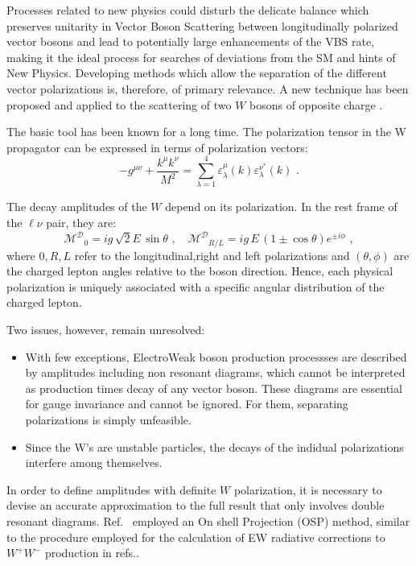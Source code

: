 Processes related to new physics could disturb the delicate balance which preserves unitarity
in Vector Boson Scattering  between longitudinally polarized vector bosons
and lead to potentially large enhancements of the VBS rate, making it the ideal process for searches of 
deviations from the SM and hints of New Physics. 
Developing methods which allow the separation of the different vector polarizations is, therefore, of primary
relevance.
A new technique has been proposed and applied to the scattering of two $W$ bosons of opposite charge
\cite{Ballestrero:2017bxn}.

The basic tool has been known for a long time.
The polarization tensor in the W propagator can be expressed in terms of polarization vectors:
\begin{equation}
-g^{\mu\nu} + \frac{k^{\mu}k^{\nu}}{M^2} = \sum_{\lambda = 1}^4 \varepsilon^{\mu}_\lambda(k) 
\varepsilon^{\nu^*}_{\lambda}(k)\,\,.
\end{equation}

The decay amplitudes of the $W$ depend on its polarization.
In the rest frame of the $\ell\nu$ pair, they are:
\begin{equation}\label{eq:longamp}
\mathcal{M^D}_0 = ig\,\sqrt{2}E \,\sin\theta \,\,,\quad
\mathcal{M^D}_{R/L} = ig\,E \,(1 \pm \cos\theta)e^{\pm i\phi} \,\,,
\end{equation}
 where $0,R,L$ refer to the longitudinal,right and left polarizations and $(\theta, \phi)$ are the charged 
 lepton angles relative to the boson direction.
Hence, each physical polarization is uniquely associated with a specific angular distribution of the charged
lepton.    

Two issues, however, remain unresolved: 

\begin{itemize}
\item With few exceptions, ElectroWeak boson production processses are described by amplitudes
including non resonant diagrams, which cannot be interpreted as
production times decay of any vector boson.
These diagrams are essential for gauge invariance and cannot be ignored.
For them, separating polarizations is simply unfeasible. 
\item Since the  W's are unstable particles, the decays of the indidual 
polarizations interfere among themselves.
 \end{itemize} 

In order to define amplitudes with definite $W$ polarization, it is necessary to devise an accurate 
approximation to the full result that only involves double resonant diagrams.
Ref.~\cite{Ballestrero:2017bxn} employed an On shell Projection (OSP) method,
similar to the procedure employed for
the calculation of EW radiative corrections to $W^+W^-$ production in
refs.\cite{Denner:2000bj}.
 
